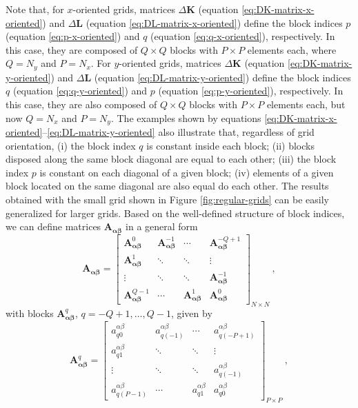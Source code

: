 \documentclass[manuscript]{geophysics}
\begin{document}
	Note that, for $x$-oriented grids, matrices $\Delta\mathbf{K}$ (equation \ref{eq:DK-matrix-x-oriented})
	and $\Delta\mathbf{L}$ (equation \ref{eq:DL-matrix-x-oriented}) define the block indices
	$p$ (equation \ref{eq:p-x-oriented}) and $q$ (equation \ref{eq:q-x-oriented}), respectively.
	In this case, they are composed of $Q \times Q$ blocks with $P \times P$ elements each, where 
	$Q = N_{y}$ and $P = N_{x}$. 
	For $y$-oriented grids, matrices $\Delta\mathbf{K}$ (equation \ref{eq:DK-matrix-y-oriented})
	and $\Delta\mathbf{L}$ (equation \ref{eq:DL-matrix-y-oriented}) define the block indices
	$q$ (equation \ref{eq:q-y-oriented}) and $p$ (equation \ref{eq:p-y-oriented}), respectively.
	In this case, they are also composed of $Q \times Q$ blocks with $P \times P$ elements each, 
	but now $Q = N_{x}$ and $P = N_{y}$.
	The examples shown by equations \ref{eq:DK-matrix-x-oriented}--\ref{eq:DL-matrix-y-oriented}
	also illustrate that, regardless of grid orientation, (i) the block index $q$ is constant 
	inside each block; (ii) blocks disposed along the same block diagonal are equal to each other; 
	(iii) the block index $p$ is constant on each diagonal of a given block; 
	(iv) elements of a given block located on the same diagonal are also equal do each other.
	The results obtained with the small grid shown in Figure \ref{fig:regular-grids}
	can be easily generalized for larger grids.
	Based on the well-defined structure of block indices, we can define 
	matrices $\mathbf{A_{\boldsymbol{\alpha\beta}}}$ in a general form
	\begin{equation}
		\mathbf{A}_{\boldsymbol{\alpha\beta}} = \begin{bmatrix}
			\mathbf{A}_{\boldsymbol{\alpha\beta}}^{0}   & \mathbf{A}_{\boldsymbol{\alpha\beta}}^{-1} & \cdots          & \mathbf{A}_{\boldsymbol{\alpha\beta}}^{-Q+1} \\
			\mathbf{A}_{\boldsymbol{\alpha\beta}}^{1}   & \ddots          & \ddots          & \vdots           \\ 
			\vdots           & \ddots          & \ddots          & \mathbf{A}_{\boldsymbol{\alpha\beta}}^{-1}   \\
			\mathbf{A}_{\boldsymbol{\alpha\beta}}^{Q-1} & \cdots          & \mathbf{A}_{\boldsymbol{\alpha\beta}}^{1}  & \mathbf{A}_{\boldsymbol{\alpha\beta}}^{0}
		\end{bmatrix}_{N \times N} \: ,
		\label{eq:BTTB_A_alpha_beta}
	\end{equation}
	with blocks $\mathbf{A}_{\boldsymbol{\alpha\beta}}^{q}$, $q = -Q+1, \dots, Q-1$, given by
	\begin{equation}
		\mathbf{A}_{\boldsymbol{\alpha\beta}}^{q} = \begin{bmatrix}
			a^{\alpha\beta}_{q0}   & a^{\alpha\beta}_{q(-1)} & \cdots  & a^{\alpha\beta}_{q(-P+1)} \\
			a^{\alpha\beta}_{q1}   & \ddots     & \ddots  & \vdots       \\ 
			\vdots      & \ddots     & \ddots  & a^{\alpha\beta}_{q(-1)}   \\
			a^{\alpha\beta}_{q(P-1)} & \cdots     & a^{\alpha\beta}_{q1}  & a^{\alpha\beta}_{q0}
		\end{bmatrix}_{P \times P} \: ,
		\label{eq:Aq_block}
	\end{equation}
\end{document}
